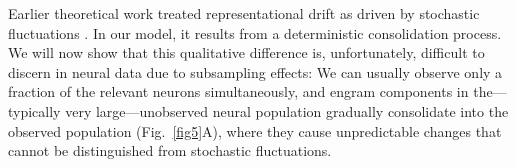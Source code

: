 Earlier theoretical work treated representational drift as driven by stochastic fluctuations \citep[e.g.,][]{Qin2023,Delamare2024}. In our model, it results from a deterministic consolidation process. We will now show that this qualitative difference is, unfortunately, difficult to discern in neural data due to subsampling effects: We can usually observe only a fraction of the relevant neurons simultaneously, and engram components in the---typically very large---unobserved neural population gradually consolidate into the observed population (Fig.~\ref{fig5}A), where they cause unpredictable changes that cannot be distinguished from stochastic fluctuations. 


